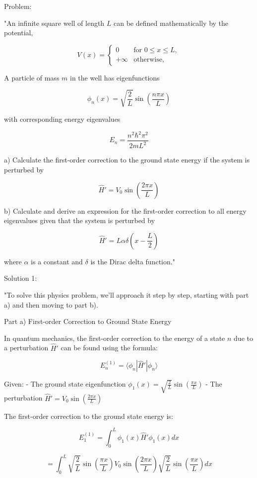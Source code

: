 Problem:

"An infinite square well of length \( L \) can be defined mathematically by the potential,

\[ V(x) = \begin{cases}
0 & \text{for } 0 \leq x \leq L,\\
+\infty  & \text{otherwise,} 
\end{cases} \]

A particle of mass \( m \) in the well has eigenfunctions

\[ \phi_{n}(x) = \sqrt{\frac{2}{L}} \sin\left(\frac{n \pi x}{L} \right) \]

with corresponding energy eigenvalues 

\[ E_{n} = \frac{n^{2}\hbar^{2}\pi^{2}}{2mL^{2}} \]

a) Calculate the first-order correction to the ground state energy if the system is perturbed by 

\[ \hat{H}' = V_{0} \sin\left(\frac{2 \pi x}{L} \right) \]

b) Calculate and derive an expression for the first-order correction to all energy eigenvalues given that the system is perturbed by 

\[ \hat{H}' = L\alpha \delta\left(x - \frac{L}{2} \right) \]

where \( \alpha \) is a constant and \( \delta \) is the Dirac delta function."

Solution 1: 

"To solve this physics problem, we'll approach it step by step, starting with part a) and then moving to part b).

Part a) First-order Correction to Ground State Energy

In quantum mechanics, the first-order correction to the energy of a state \( n \) due to a perturbation \( \hat{H}' \) can be found using the formula:

\[ E_n^{(1)} = \langle \phi_n | \hat{H}' | \phi_n \rangle \]

Given:
- The ground state eigenfunction \( \phi_1(x) = \sqrt{\frac{2}{L}} \sin\left(\frac{\pi x}{L} \right) \)
- The perturbation \( \hat{H}' = V_0 \sin\left(\frac{2 \pi x}{L} \right) \)

The first-order correction to the ground state energy is:

\[ E_1^{(1)} = \int_0^L \phi_1(x) \hat{H}' \phi_1(x) dx \]

\[ = \int_0^L \sqrt{\frac{2}{L}} \sin\left(\frac{\pi x}{L} \right) V_0 \sin\left(\frac{2 \pi x}{L} \right) \sqrt{\frac{2}{L}} \sin\left(\frac{\pi x}{L} \right) dx \]

